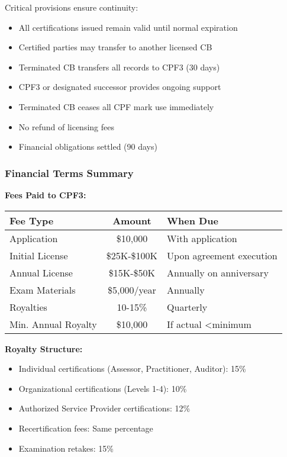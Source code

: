 \documentclass[11pt,a4paper]{article}
\begin{document}
Critical provisions ensure continuity:

\begin{itemize}
\item All certifications issued remain valid until normal expiration
\item Certified parties may transfer to another licensed CB
\item Terminated CB transfers all records to CPF3 (30 days)
\item CPF3 or designated successor provides ongoing support
\item Terminated CB ceases all CPF mark use immediately
\item No refund of licensing fees
\item Financial obligations settled (90 days)
\end{itemize}

\subsubsection{Financial Terms Summary}

\textbf{Fees Paid to CPF3:}

\begin{tabular}{|l|c|p{6cm}|}
\hline
\textbf{Fee Type} & \textbf{Amount} & \textbf{When Due} \\
\hline
Application & \$10,000 & With application \\
Initial License & \$25K-\$100K & Upon agreement execution \\
Annual License & \$15K-\$50K & Annually on anniversary \\
Exam Materials & \$5,000/year & Annually \\
Royalties & 10-15\% & Quarterly \\
Min. Annual Royalty & \$10,000 & If actual <minimum \\
\hline
\end{tabular}

\textbf{Royalty Structure:}

\begin{itemize}
\item Individual certifications (Assessor, Practitioner, Auditor): 15\%
\item Organizational certifications (Levels 1-4): 10\%
\item Authorized Service Provider certifications: 12\%
\item Recertification fees: Same percentage
\item Examination retakes: 15\%
\end{itemize}
\end{document}
